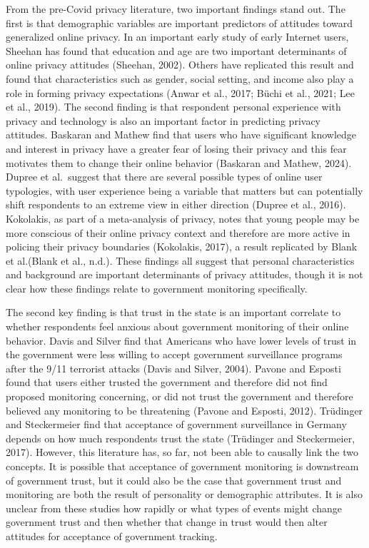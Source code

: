 \documentclass[
  letterpaper,
  DIV=11,
  numbers=noendperiod]{scrartcl}
\begin{document}
From the pre-Covid privacy literature, two important findings stand out.
The first is that demographic variables are important predictors of
attitudes toward generalized online privacy. In an important early study
of early Internet users, Sheehan has found that education and age are
two important determinants of online privacy attitudes (Sheehan, 2002).
Others have replicated this result and found that characteristics such
as gender, social setting, and income also play a role in forming
privacy expectations (Anwar et al., 2017; Büchi et al., 2021; Lee et
al., 2019). The second finding is that respondent personal experience
with privacy and technology is also an important factor in predicting
privacy attitudes. Baskaran and Mathew find that users who have
significant knowledge and interest in privacy have a greater fear of
losing their privacy and this fear motivates them to change their online
behavior (Baskaran and Mathew, 2024). Dupree et al.~suggest that there
are several possible types of online user typologies, with user
experience being a variable that matters but can potentially shift
respondents to an extreme view in either direction (Dupree et al.,
2016). Kokolakis, as part of a meta-analysis of privacy, notes that
young people may be more conscious of their online privacy context and
therefore are more active in policing their privacy boundaries
(Kokolakis, 2017), a result replicated by Blank et al.(Blank et al.,
n.d.). These findings all suggest that personal characteristics and
background are important determinants of privacy attitudes, though it is
not clear how these findings relate to government monitoring
specifically.

The second key finding is that trust in the state is an important
correlate to whether respondents feel anxious about government
monitoring of their online behavior. Davis and Silver find that
Americans who have lower levels of trust in the government were less
willing to accept government surveillance programs after the 9/11
terrorist attacks (Davis and Silver, 2004). Pavone and Esposti found
that users either trusted the government and therefore did not find
proposed monitoring concerning, or did not trust the government and
therefore believed any monitoring to be threatening (Pavone and Esposti,
2012). Trüdinger and Steckermeier find that acceptance of government
surveillance in Germany depends on how much respondents trust the state
(Trüdinger and Steckermeier, 2017). However, this literature has, so
far, not been able to causally link the two concepts. It is possible
that acceptance of government monitoring is downstream of government
trust, but it could also be the case that government trust and
monitoring are both the result of personality or demographic attributes.
It is also unclear from these studies how rapidly or what types of
events might change government trust and then whether that change in
trust would then alter attitudes for acceptance of government tracking.
\end{document}
